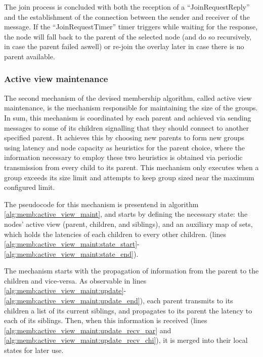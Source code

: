 The join process is concluded with both the reception of a ``JoinRequestReply'' and the establishment of the connection between the sender and receiver of the message. If the ``JoinRequestTimer'' timer triggers while waiting for the response, the node will fall back to the parent of the selected node (and do so recursively, in case the parent failed aswell) or re-join the overlay later in case there is no parent available. 

\subsubsection{Active view maintenance} \label{sec:overlay_network:active_view_maint}

The second mechanism of the devised membership algorithm, called active view maintenance, is the mechanism responsible for maintaining the size of the groups. In sum, this mechanism is coordinated by each parent and achieved via sending messages to some of its children signalling that they should connect to another specified parent. It achieves this by choosing new parents to form new groups using latency and node capacity as heuristics for the parent choice, where the information necessary to employ these two heuristics is obtained via periodic transmission from every child to its parent. This mechanism only executes when a group exceeds its size limit and attempts to keep group sized near the maximum configured limit.

The pseudocode for this mechanism is presentend in algorithm \ref{alg:memb:active_view_maint}, and starts by defining the necessary state: the nodes' active view (parent, children, and siblings), and an auxiliary map of sets, which holds the latencies of each children to every other children. (lines \ref{alg:memb:active_view_maint:state_start}-\ref{alg:memb:active_view_maint:state_end}). 



The mechanism starts with the propagation of information from the parent to the children and vice-versa. As observable in lines \ref{alg:memb:active_view_maint:update}-\ref{alg:memb:active_view_maint:update_end}), each parent transmits to its children a list of its current siblings, and propagates to its parent the latency to each of its siblings. Then, when this information is received (lines \ref{alg:memb:active_view_maint:update_recv_par} and \ref{alg:memb:active_view_maint:update_recv_chi}), it is merged into their local states for later use.

